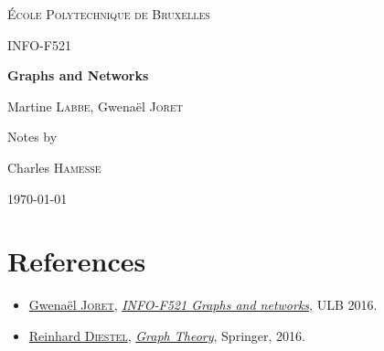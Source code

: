 \documentclass[11pt]{book}
\begin{document}
\begin{titlepage}
	\centering
	\vspace{1cm}
	{\scshape\LARGE École Polytechnique de Bruxelles \par}
	\vspace{3.5cm}
	{\scshape\Large INFO-F521\par}
	\vspace{.5cm}
	{\huge\bfseries Graphs and Networks\par}
	\vspace{2cm}
	{\Large Martine \textsc{Labbe}, Gwenaël \textsc{Joret}\par}
	\vfill
	Notes by \par
	Charles \textsc{Hamesse}

	\vfill

	{\large \today\par}
\end{titlepage}
\tableofcontents









\chapter*{References}
%

\begin{itemize}
\item
  \href{http://www.ulb.ac.be/di/algo/gjoret/}{Gwenaël \textsc{Joret}},
  \href{http://banssbfr.ulb.ac.be/PROD_frFR/bzscrse.p_disp_course_detail?cat_term_in=201617&subj_code_in=INFO&crse_numb_in=F521&PPAGE=ESC_PROGCAT_AREREQ&PPROGCODE=MA-INFO&PAREA=M-INFOS&PARETERM=201617&PTERM=201617}{\textit{INFO-F521 Graphs and networks}},
  ULB 2016.

\item
  \href{http://www.math.uni-hamburg.de/home/diestel/index.html}{Reinhard \textsc{Diestel}},
  \href{http://diestel-graph-theory.com/index.html}{\textit{Graph Theory}},
  Springer, 2016.

\end{itemize}
\end{document}
